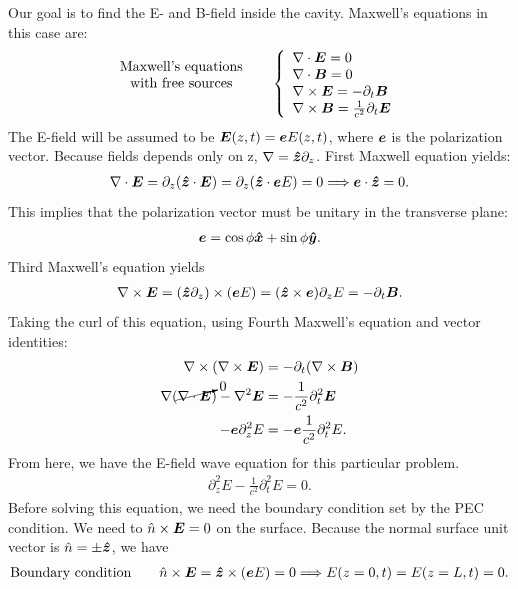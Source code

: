 Our goal is to find the E- and B-field inside the cavity. Maxwell's equations in this case are:
\begin{align}
    \shortstack{Maxwell's equations\\with free sources}\qquad\left\{
    \begin{array}{l}
        \nabla\cdot\bE=0\\
        \nabla\cdot\bB=0\\
        \nabla\times\bE=-\partial_t\bB\\
        \nabla\times\bB=\frac{1}{c^2}\partial_t\bE
    \end{array}\right.
\end{align}
The E-field will be assumed to be $\bm{E}(z,t)=\bm{e} E(z,t)$, where $\bm{e}$ is the polarization vector. Because fields depends only on z, $\nabla=\bm{\hat{z}}\partial_z$.
First Maxwell equation yields:
\begin{align*}
    \nabla\cdot\bm{E}=\partial_z(\bm{\hat{z}}\cdot\bm{E})=\partial_z(\bm{\hat{z}}\cdot\bm{e} E)=0\Longrightarrow\bm{e}\cdot\bm{\hat{z}}=0.
\end{align*}
This implies that the polarization vector must be unitary in the transverse plane:
\begin{align*}
    \bm{e}=\cos\phi\bm{\hat{x}}+\sin\phi\bm{\hat{y}}.
\end{align*}
Third Maxwell's equation yields 
\begin{align*}
    \nabla\times\bm{E}=(\bm{\hat{z}}\partial_z)\times(\bm{e} E)=(\bm{\hat{z}}\times\bm{e})\partial_zE=-\partial_t\bm{B}.
\end{align*}
Taking the curl of this equation, using Fourth Maxwell's equation and vector identities:
\begin{align*}
    \nabla\times(\nabla\times\bm{E})&=-\partial_t(\nabla\times\bm{B})\\
    \nabla(\cancelto{0}{\nabla\cdot\bm{E}})-\nabla^2\bm{E}&=-\frac{1}{c^2}\partial_t^2\bm{E}\\
    -\bm{e}\partial_z^2E&=-\bm{e}\frac{1}{c^2}\partial_t^2E.
\end{align*}
From here, we have the E-field wave equation for this particular problem.
\begin{align}
    \partial_z^2E-\frac{1}{c^2}\partial_t^2E=0.
    \label{eq:waveequation_cavity}
\end{align}
Before solving this equation, we need the boundary condition set by the PEC condition. We need to $\hat{n}\times\bm{E}=0$ on the surface. Because 
the normal surface unit vector is $\hat{n}=\pm\bm{\hat{z}}$, we have 
\begin{align*}
    \text{Boundary condition}\qquad\hat{n}\times\bm{E}=\bm{\hat{z}}\times(\bm{e} E)=0\Longrightarrow E(z=0,t)=E(z=L,t)=0.
\end{align*} 
